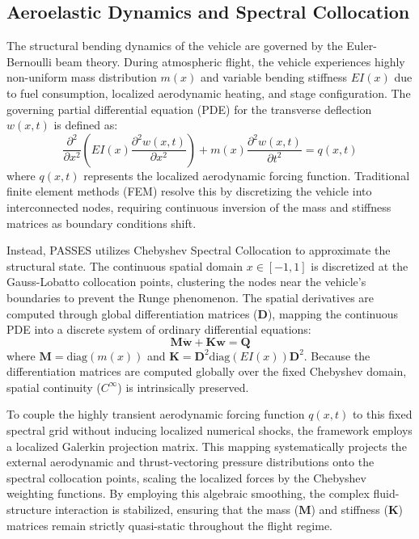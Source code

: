 \documentclass[11pt,a4paper]{article}
\theoremstyle{definition}
\numberwithin{equation}{section}
\begin{document}
\subsection{Aeroelastic Dynamics and Spectral Collocation}
The structural bending dynamics of the vehicle are governed by the Euler-Bernoulli beam theory. During atmospheric flight, the vehicle experiences highly non-uniform mass distribution $m(x)$ and variable bending stiffness $EI(x)$ due to fuel consumption, localized aerodynamic heating, and stage configuration. The governing partial differential equation (PDE) for the transverse deflection $w(x,t)$ is defined as:
\begin{equation}
\frac{\partial^2}{\partial x^2} \left( EI(x) \frac{\partial^2 w(x,t)}{\partial x^2} \right) + m(x) \frac{\partial^2 w(x,t)}{\partial t^2} = q(x,t)
\end{equation}
where $q(x,t)$ represents the localized aerodynamic forcing function. Traditional finite element methods (FEM) resolve this by discretizing the vehicle into interconnected nodes, requiring continuous inversion of the mass and stiffness matrices as boundary conditions shift. 

Instead, PASSES utilizes Chebyshev Spectral Collocation to approximate the structural state. The continuous spatial domain $x \in [-1, 1]$ is discretized at the Gauss-Lobatto collocation points, clustering the nodes near the vehicle's boundaries to prevent the Runge phenomenon. The spatial derivatives are computed through global differentiation matrices ($\mathbf{D}$), mapping the continuous PDE into a discrete system of ordinary differential equations:
\begin{equation}
\mathbf{M} \mathbf{\ddot{w}} + \mathbf{K} \mathbf{w} = \mathbf{Q}
\end{equation}
where $\mathbf{M} = \text{diag}(m(x))$ and $\mathbf{K} = \mathbf{D}^2 \text{diag}(EI(x)) \mathbf{D}^2$. Because the differentiation matrices are computed globally over the fixed Chebyshev domain, spatial continuity ($C^\infty$) is intrinsically preserved. 

To couple the highly transient aerodynamic forcing function $q(x,t)$ to this fixed spectral grid without inducing localized numerical shocks, the framework employs a localized Galerkin projection matrix. This mapping systematically projects the external aerodynamic and thrust-vectoring pressure distributions onto the spectral collocation points, scaling the localized forces by the Chebyshev weighting functions. By employing this algebraic smoothing, the complex fluid-structure interaction is stabilized, ensuring that the mass ($\mathbf{M}$) and stiffness ($\mathbf{K}$) matrices remain strictly quasi-static throughout the flight regime.
\end{document}
